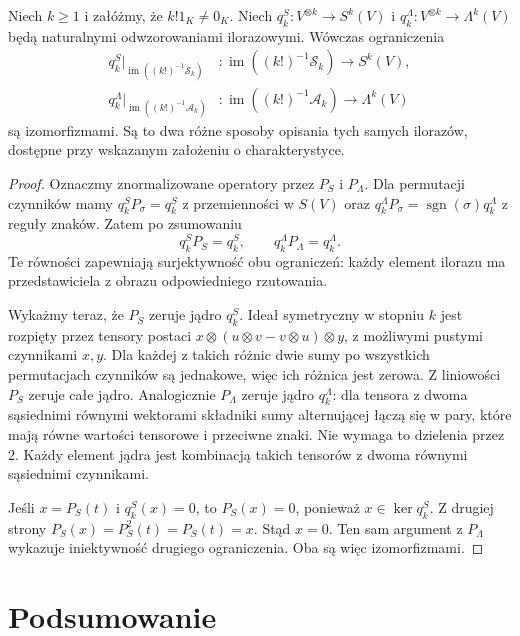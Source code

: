 \begin{stwierdzenie}
\label{prop:lin11-projekcje-ilorazy}
Niech \(k\ge1\) i załóżmy,
że \(k!1_K\ne0_K\).
Niech \(q_k^S\colon
V^{\otimes k}\to S^k(V)\)
i \(q_k^\Lambda\colon
V^{\otimes k}\to\Lambda^k(V)\)
będą naturalnymi odwzorowaniami
ilorazowymi.
Wówczas ograniczenia
\[
 \begin{aligned}
 q_k^S|_{\operatorname{im}((k!)^{-1}\mathcal S_k)}
 &\colon \operatorname{im}((k!)^{-1}\mathcal S_k)
       \longrightarrow S^k(V),\\
 q_k^\Lambda|_{\operatorname{im}((k!)^{-1}\mathcal A_k)}
 &\colon \operatorname{im}((k!)^{-1}\mathcal A_k)
       \longrightarrow \Lambda^k(V)
 \end{aligned}
\]
są izomorfizmami.
Są to dwa różne sposoby
opisania tych samych ilorazów,
dostępne przy wskazanym
założeniu o charakterystyce.
\end{stwierdzenie}
\begin{proof}
Oznaczmy znormalizowane operatory
przez \(P_S\) i \(P_\Lambda\).
Dla permutacji czynników
mamy
\(q_k^S P_\sigma=q_k^S\)
z przemienności w \(S(V)\)
oraz
\(q_k^\Lambda P_\sigma
=\operatorname{sgn}(\sigma)q_k^\Lambda\)
z reguły znaków.
Zatem po zsumowaniu
\[
 q_k^S P_S=q_k^S,\qquad
 q_k^\Lambda P_\Lambda=q_k^\Lambda.
\]
Te równości zapewniają
surjektywność obu ograniczeń:
każdy element ilorazu
ma przedstawiciela z obrazu
odpowiedniego rzutowania.

Wykażmy teraz, że
\(P_S\) zeruje jądro \(q_k^S\).
Ideał symetryczny w stopniu
\(k\) jest rozpięty przez
tensory postaci
\(x\otimes(u\otimes v-v\otimes u)\otimes y\),
z możliwymi pustymi czynnikami
\(x,y\). Dla każdej z takich
różnic dwie sumy po
wszystkich permutacjach
czynników są jednakowe,
więc ich różnica jest zerowa.
Z liniowości \(P_S\)
zeruje całe jądro.
Analogicznie
\(P_\Lambda\) zeruje jądro
\(q_k^\Lambda\):
dla tensora z dwoma
sąsiednimi równymi wektorami
składniki sumy alternującej
łączą się w pary,
które mają równe wartości
tensorowe i przeciwne znaki.
Nie wymaga to dzielenia
przez \(2\).
Każdy element jądra
jest kombinacją takich
tensorów z dwoma
równymi sąsiednimi czynnikami.

Jeśli \(x=P_S(t)\)
i \(q_k^S(x)=0\), to
\(P_S(x)=0\), ponieważ
\(x\in\ker q_k^S\).
Z drugiej strony
\(P_S(x)=P_S^2(t)=P_S(t)=x\).
Stąd \(x=0\).
Ten sam argument
z \(P_\Lambda\) wykazuje
iniektywność drugiego
ograniczenia. Oba są więc
izomorfizmami.
\end{proof}

\section{Podsumowanie}
\label{sec:lin11-podsumowanie}


